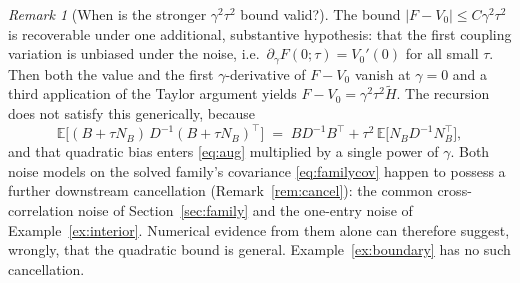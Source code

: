 \documentclass[11pt]{article}
\theoremstyle{remark}
\newtheorem{remark}{Remark}
\newcommand{\E}{\mathbb{E}}
\begin{document}
\begin{remark}[When is the stronger $\gamma^2\tau^2$ bound valid?]
\label{rem:gamma2}
The bound $|F - V_0| \le C\gamma^2\tau^2$ is recoverable under one
additional, substantive hypothesis: that the first coupling variation is
unbiased under the noise, i.e.\
$\partial_\gamma F(0;\tau) = V_0'(0)$ for all small $\tau$. Then both the
value and the first $\gamma$-derivative of $F - V_0$ vanish at $\gamma = 0$
and a third application of the Taylor argument yields
$F - V_0 = \gamma^2\tau^2 \widetilde H$. The recursion does not satisfy this
generically, because
\[
  \E\big[(B + \tau N_B)\, D^{-1} (B + \tau N_B)^\top\big]
  \;=\; B D^{-1} B^\top + \tau^2\, \E\big[N_B D^{-1} N_B^\top\big],
\]
and that quadratic bias enters \eqref{eq:aug} multiplied by a single power
of $\gamma$. Both noise models on the solved family's covariance
\eqref{eq:familycov} happen to possess a further downstream cancellation
(Remark~\ref{rem:cancel}): the common cross-correlation noise of
Section~\ref{sec:family} and the one-entry noise of
Example~\ref{ex:interior}. Numerical evidence from them alone can therefore
suggest, wrongly, that the quadratic bound is general.
Example~\ref{ex:boundary} has no such cancellation.
\end{remark}
\end{document}
